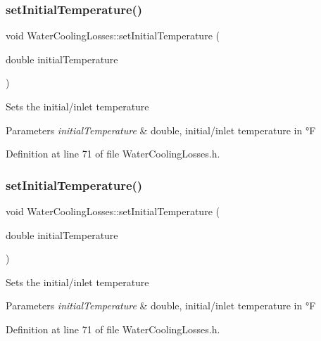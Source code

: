 \subsubsection{\texorpdfstring{set\+Initial\+Temperature()}{setInitialTemperature()}\hspace{0.1cm}{\footnotesize\ttfamily [1/3]}}
{\footnotesize\ttfamily void Water\+Cooling\+Losses\+::set\+Initial\+Temperature (\begin{DoxyParamCaption}\item[{double}]{initial\+Temperature }\end{DoxyParamCaption})\hspace{0.3cm}{\ttfamily [inline]}}

Sets the initial/inlet temperature 
\begin{DoxyParams}{Parameters}
{\em initial\+Temperature} & double, initial/inlet temperature in °F \\
\hline
\end{DoxyParams}


Definition at line 71 of file Water\+Cooling\+Losses.\+h.

\mbox{\label{class_water_cooling_losses_a56b0b64b71ecbece780622d5f4b536ba}} 
\subsubsection{\texorpdfstring{set\+Initial\+Temperature()}{setInitialTemperature()}\hspace{0.1cm}{\footnotesize\ttfamily [2/3]}}
{\footnotesize\ttfamily void Water\+Cooling\+Losses\+::set\+Initial\+Temperature (\begin{DoxyParamCaption}\item[{double}]{initial\+Temperature }\end{DoxyParamCaption})\hspace{0.3cm}{\ttfamily [inline]}}

Sets the initial/inlet temperature 
\begin{DoxyParams}{Parameters}
{\em initial\+Temperature} & double, initial/inlet temperature in °F \\
\hline
\end{DoxyParams}


Definition at line 71 of file Water\+Cooling\+Losses.\+h.

